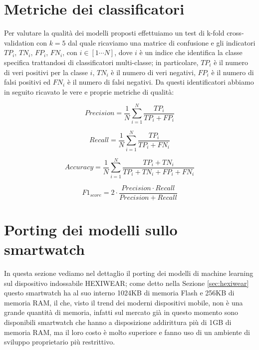 \section{Metriche dei classificatori}
\label{sec:metrics}

Per valutare la qualità dei modelli proposti effettuiamo un test di k-fold cross-validation con $k=5$ dal quale ricaviamo una matrice di confusione e gli indicatori $TP_i$, $TN_i$, $FP_i$, $FN_i$, con $i \in [1\cdots N]$, dove $i$ è un indice che identifica la classe specifica trattandosi di classificatori multi-classe; in particolare, $TP_i$ è il numero di veri positivi per la classe $i$, $TN_i$ è il numero di veri negativi, $FP_i$ è il numero di falsi positivi ed $FN_i$ è il numero di falsi negativi. Da questi identificatori abbiamo in seguito ricavato le vere e proprie metriche di qualità: 

\begin{equation}
    Precision = \dfrac{1}{N} \sum_{i=1}^{N} \dfrac{TP_i}{TP_i + FP_i}
    \label{eq:precision}
\end{equation}

\begin{equation}
    Recall = \dfrac{1}{N} \sum_{i=1}^{N} \dfrac{TP_i}{TP_i + FN_i}
    \label{eq:recall}
\end{equation}

\begin{equation}
    Accuracy = \dfrac{1}{N} \sum_{i=1}^{N} \dfrac{TP_i + TN_i}{TP_i + TN_i + FP_i + FN_i}    
    \label{eq:accuracy}
\end{equation}

\begin{equation}
    F1_{score} = 2 \cdot \dfrac{Precision \cdot Recall}{Precision + Recall}
    \label{eq:f1}
\end{equation}

\section{Porting dei modelli sullo smartwatch}
\label{sec:porting-hexiwear}

In questa sezione vediamo nel dettaglio il porting dei modelli di machine learning sul dispositivo indossabile HEXIWEAR; come detto nella Sezione \ref{sec:hexiwear} questo smartwatch ha al suo interno 1024KB di memoria Flash e 256KB di memoria RAM, il che, visto il trend dei moderni dispositivi mobile, non è una grande quantità di memoria, infatti sul mercato già in questo momento sono disponibili smartwatch che hanno a disposizione addirittura più di 1GB di memoria RAM, ma il loro costo è molto superiore e fanno uso di un ambiente di sviluppo proprietario più restrittivo.

